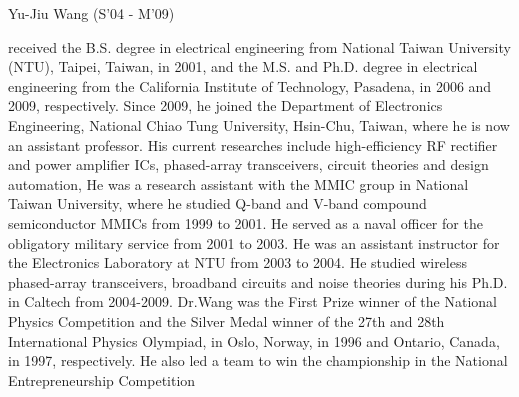 % 


\begin{IEEEbiography}{Yu-Jiu Wang  (S'04 - M'09)}


received the B.S. degree in electrical engineering from National Taiwan University (NTU), Taipei, Taiwan, in 2001, and the M.S. and Ph.D. degree in electrical engineering from the California Institute of Technology, Pasadena, in 2006 and 2009, respectively. Since 2009, he joined the Department of Electronics Engineering, National Chiao Tung University, Hsin-Chu, Taiwan, where he is now an assistant professor. His current researches include high-efficiency RF rectifier and power amplifier ICs, phased-array transceivers, circuit theories and design automation, 
    He was a research assistant with the MMIC group in National Taiwan University, where he studied Q-band and V-band compound semiconductor MMICs from 1999 to 2001. He served as a naval officer for the obligatory military service from 2001 to 2003. He was an assistant instructor for the Electronics Laboratory at NTU from 2003 to 2004. He studied wireless phased-array transceivers, broadband circuits and noise theories during his Ph.D. in Caltech from 2004-2009.  
    Dr.Wang was the First Prize winner of the National Physics Competition and the Silver Medal winner of the 27th and 28th International Physics Olympiad, in Oslo, Norway, in 1996 and Ontario, Canada, in 1997, respectively. He also led a team to win the championship in the National Entrepreneurship Competition

\end{IEEEbiography}


